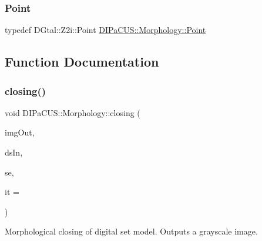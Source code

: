 \mbox{\label{namespaceDIPaCUS_1_1Morphology_a1b95c2849cc5d6b0852b34aa4496f3cd}} 
\subsubsection{\texorpdfstring{Point}{Point}}
{\footnotesize\ttfamily typedef D\+Gtal\+::\+Z2i\+::\+Point \hyperlink{namespaceDIPaCUS_1_1Morphology_a1b95c2849cc5d6b0852b34aa4496f3cd}{D\+I\+Pa\+C\+U\+S\+::\+Morphology\+::\+Point}}



\subsection{Function Documentation}
\mbox{\label{namespaceDIPaCUS_1_1Morphology_a5855de805a41a85c6e932fe291f3cbed}} 
\subsubsection{\texorpdfstring{closing()}{closing()}\hspace{0.1cm}{\footnotesize\ttfamily [1/2]}}
{\footnotesize\ttfamily void D\+I\+Pa\+C\+U\+S\+::\+Morphology\+::closing (\begin{DoxyParamCaption}\item[{\hyperlink{namespaceDIPaCUS_1_1Morphology_a9aff9edf28d681accfc54435fbefcbee}{Image2D} \&}]{img\+Out,  }\item[{const \hyperlink{namespaceDIPaCUS_1_1Morphology_ab69fa725716b0ed4c311c0d00a292be7}{Digital\+Set} \&}]{ds\+In,  }\item[{const \hyperlink{structDIPaCUS_1_1Morphology_1_1StructuringElement}{Structuring\+Element}}]{se,  }\item[{\hyperlink{namespaceDIPaCUS_1_1Morphology_a8ffa7d1c2023be8b21bc87a4b7df7cca}{Number\+Iterations}}]{it = {} }\end{DoxyParamCaption})}



Morphological closing of digital set model. Outputs a grayscale image. 


